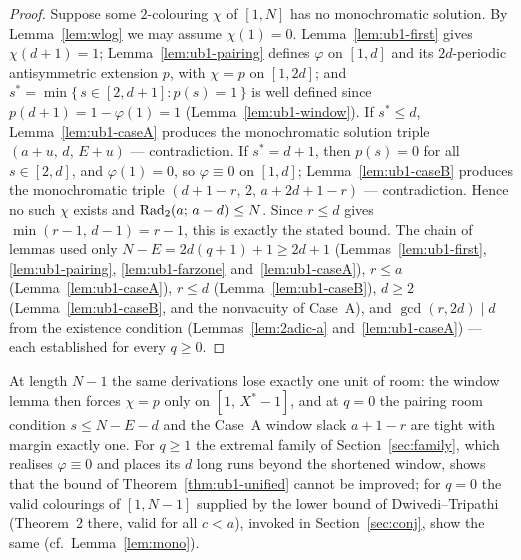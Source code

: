 \begin{proof}
Suppose some $2$-colouring $\chi$ of $[1, N]$ has no monochromatic
solution. By Lemma~\ref{lem:wlog} we may assume $\chi(1) = 0$.
Lemma~\ref{lem:ub1-first} gives $\chi(d+1) = 1$;
Lemma~\ref{lem:ub1-pairing} defines $\varphi$ on $[1,d]$ and its
$2d$-periodic antisymmetric extension $p$, with $\chi = p$ on $[1, 2d]$;
and $s^{*} = \min\{\, s \in [2, d+1] : p(s) = 1 \,\}$ is well defined since
$p(d+1) = 1 - \varphi(1) = 1$ (Lemma~\ref{lem:ub1-window}). If
$s^{*} \le d$, Lemma~\ref{lem:ub1-caseA} produces the monochromatic
solution triple $(a + u,\, d,\, E + u)$ --- contradiction. If
$s^{*} = d + 1$, then $p(s) = 0$ for all $s \in [2, d]$, and
$\varphi(1) = 0$, so $\varphi \equiv 0$ on $[1, d]$;
Lemma~\ref{lem:ub1-caseB} produces the monochromatic triple
$(d + 1 - r,\, 2,\, a + 2d + 1 - r)$ --- contradiction. Hence no such
$\chi$ exists and $\mathrm{Rad}_2(a;\, a - d) \le N$. Since $r \le d$ gives
$\min(r-1,\, d-1) = r - 1$, this is exactly the stated bound. The chain of
lemmas used only $N - E = 2d(q+1) + 1 \ge 2d + 1$
(Lemmas~\ref{lem:ub1-first}, \ref{lem:ub1-pairing},
\ref{lem:ub1-farzone} and~\ref{lem:ub1-caseA}), $r \le a$
(Lemma~\ref{lem:ub1-caseA}), $r \le d$ (Lemma~\ref{lem:ub1-caseB}),
$d \ge 2$ (Lemma~\ref{lem:ub1-caseB}, and the nonvacuity of Case~A), and
$\gcd(r, 2d) \mid d$ from the existence condition
(Lemmas~\ref{lem:2adic-a} and~\ref{lem:ub1-caseA}) --- each established
for every $q \ge 0$.
\end{proof}

\begin{remark}[tightness]
At length $N - 1$ the same derivations lose exactly one unit of room: the
window lemma then forces $\chi = p$ only on $[1,\, X^{*} - 1]$, and at
$q = 0$ the pairing room condition $s \le N - E - d$ and the Case~A window
slack $a + 1 - r$ are tight with margin exactly one. For $q \ge 1$ the
extremal family of Section~\ref{sec:family}, which realises
$\varphi \equiv 0$ and places its $d$ long runs beyond the shortened
window, shows that the bound of Theorem~\ref{thm:ub1-unified} cannot be
improved; for $q = 0$ the valid colourings of $[1, N-1]$ supplied by the
lower bound of Dwivedi--Tripathi \cite{DT2020} (Theorem~2 there, valid for
all $c < a$), invoked in Section~\ref{sec:conj}, show the same
(cf.\ Lemma~\ref{lem:mono}).
\end{remark}
